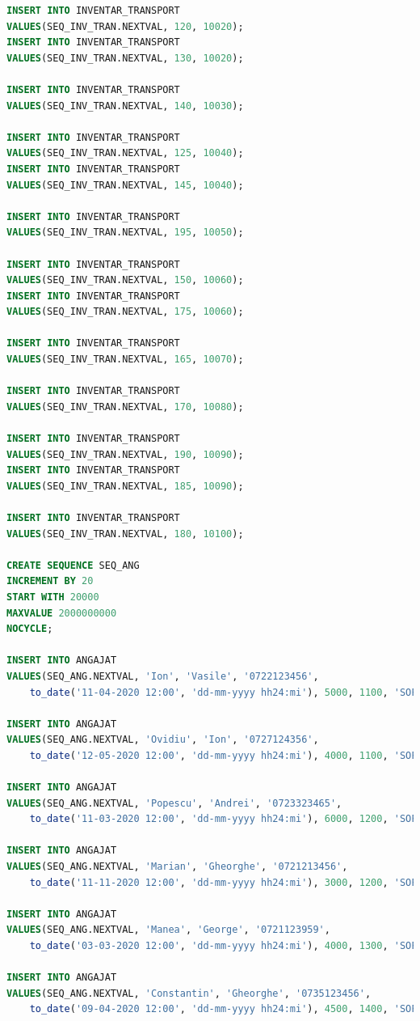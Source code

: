 \documentclass[12pt, a4paper]{article}
\begin{document}
\begin{lstlisting}[language=SQL]
INSERT INTO INVENTAR_TRANSPORT
VALUES(SEQ_INV_TRAN.NEXTVAL, 120, 10020);
INSERT INTO INVENTAR_TRANSPORT
VALUES(SEQ_INV_TRAN.NEXTVAL, 130, 10020);

INSERT INTO INVENTAR_TRANSPORT
VALUES(SEQ_INV_TRAN.NEXTVAL, 140, 10030);

INSERT INTO INVENTAR_TRANSPORT
VALUES(SEQ_INV_TRAN.NEXTVAL, 125, 10040);
INSERT INTO INVENTAR_TRANSPORT
VALUES(SEQ_INV_TRAN.NEXTVAL, 145, 10040);

INSERT INTO INVENTAR_TRANSPORT
VALUES(SEQ_INV_TRAN.NEXTVAL, 195, 10050);

INSERT INTO INVENTAR_TRANSPORT
VALUES(SEQ_INV_TRAN.NEXTVAL, 150, 10060);
INSERT INTO INVENTAR_TRANSPORT
VALUES(SEQ_INV_TRAN.NEXTVAL, 175, 10060);

INSERT INTO INVENTAR_TRANSPORT
VALUES(SEQ_INV_TRAN.NEXTVAL, 165, 10070);

INSERT INTO INVENTAR_TRANSPORT
VALUES(SEQ_INV_TRAN.NEXTVAL, 170, 10080);

INSERT INTO INVENTAR_TRANSPORT
VALUES(SEQ_INV_TRAN.NEXTVAL, 190, 10090);
INSERT INTO INVENTAR_TRANSPORT
VALUES(SEQ_INV_TRAN.NEXTVAL, 185, 10090);

INSERT INTO INVENTAR_TRANSPORT
VALUES(SEQ_INV_TRAN.NEXTVAL, 180, 10100);

CREATE SEQUENCE SEQ_ANG
INCREMENT BY 20
START WITH 20000
MAXVALUE 2000000000
NOCYCLE;

INSERT INTO ANGAJAT
VALUES(SEQ_ANG.NEXTVAL, 'Ion', 'Vasile', '0722123456', 
    to_date('11-04-2020 12:00', 'dd-mm-yyyy hh24:mi'), 5000, 1100, 'SOFER', null);

INSERT INTO ANGAJAT
VALUES(SEQ_ANG.NEXTVAL, 'Ovidiu', 'Ion', '0727124356', 
    to_date('12-05-2020 12:00', 'dd-mm-yyyy hh24:mi'), 4000, 1100, 'SOFER', null);
    
INSERT INTO ANGAJAT
VALUES(SEQ_ANG.NEXTVAL, 'Popescu', 'Andrei', '0723323465', 
    to_date('11-03-2020 12:00', 'dd-mm-yyyy hh24:mi'), 6000, 1200, 'SOFER', null);
    
INSERT INTO ANGAJAT
VALUES(SEQ_ANG.NEXTVAL, 'Marian', 'Gheorghe', '0721213456', 
    to_date('11-11-2020 12:00', 'dd-mm-yyyy hh24:mi'), 3000, 1200, 'SOFER', null);
    
INSERT INTO ANGAJAT
VALUES(SEQ_ANG.NEXTVAL, 'Manea', 'George', '0721123959', 
    to_date('03-03-2020 12:00', 'dd-mm-yyyy hh24:mi'), 4000, 1300, 'SOFER', null);
    
INSERT INTO ANGAJAT
VALUES(SEQ_ANG.NEXTVAL, 'Constantin', 'Gheorghe', '0735123456', 
    to_date('09-04-2020 12:00', 'dd-mm-yyyy hh24:mi'), 4500, 1400, 'SOFER', null);
    

\end{lstlisting}
\end{document}
